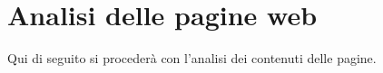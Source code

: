 \section{Analisi delle pagine web}
Qui di seguito si procederà con l'analisi dei contenuti delle pagine.
